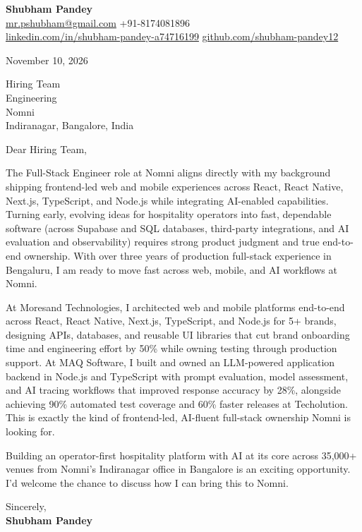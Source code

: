 \documentclass[a4paper,11pt]{article}
\begin{document}
\textbf{\Large Shubham Pandey}\\
\href{mailto:mr.pshubham@gmail.com}{mr.pshubham@gmail.com} \quad +91-8174081896\\
\href{https://www.linkedin.com/in/shubham-pandey-a74716199/}{linkedin.com/in/shubham-pandey-a74716199} \quad
\href{https://github.com/shubham-pandey12}{github.com/shubham-pandey12}

\vspace{1em}
November 10, 2026

\vspace{1em}
Hiring Team\\
Engineering\\
Nomni\\
Indiranagar, Bangalore, India

\vspace{1em}
Dear Hiring Team,

The Full-Stack Engineer role at Nomni aligns directly with my background shipping frontend-led web and mobile experiences across React, React Native, Next.js, TypeScript, and Node.js while integrating AI-enabled capabilities. Turning early, evolving ideas for hospitality operators into fast, dependable software (across Supabase and SQL databases, third-party integrations, and AI evaluation and observability) requires strong product judgment and true end-to-end ownership. With over three years of production full-stack experience in Bengaluru, I am ready to move fast across web, mobile, and AI workflows at Nomni.

At Moresand Technologies, I architected web and mobile platforms end-to-end across React, React Native, Next.js, TypeScript, and Node.js for 5+ brands, designing APIs, databases, and reusable UI libraries that cut brand onboarding time and engineering effort by 50\% while owning testing through production support. At MAQ Software, I built and owned an LLM-powered application backend in Node.js and TypeScript with prompt evaluation, model assessment, and AI tracing workflows that improved response accuracy by 28\%, alongside achieving 90\% automated test coverage and 60\% faster releases at Techolution. This is exactly the kind of frontend-led, AI-fluent full-stack ownership Nomni is looking for.

Building an operator-first hospitality platform with AI at its core across 35,000+ venues from Nomni's Indiranagar office in Bangalore is an exciting opportunity. I'd welcome the chance to discuss how I can bring this to Nomni.

\vspace{1em}
Sincerely,\\[0.5em]
\textbf{Shubham Pandey}
\end{document}
